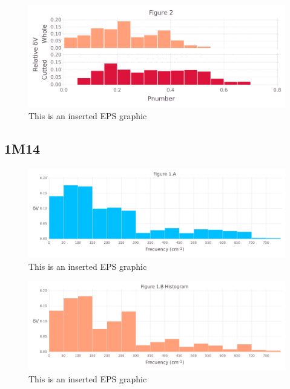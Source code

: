 \documentclass[10pt,letterpaper]{article}
\begin{document}
\begin{figure}[ht]
\begin{center}
\includegraphics[scale=0.5]{1xkk/3both_figure_very_hi-precision.pdf}
\caption{This is an inserted EPS graphic}
\label{fig13}
\end{center}
\end{figure}

\FloatBarrier
\newpage

\subsection{1M14}

\begin{figure}[ht]
\begin{center}
\includegraphics[scale=0.5]{1m14/1afigure_very_hi-precision.pdf}
\caption{This is an inserted EPS graphic}
\label{fig1}
\end{center}
\end{figure}

\begin{figure}[ht]
\begin{center}
\includegraphics[scale=0.5]{1m14/1bfigure_very_hi-precision.pdf}
\caption{This is an inserted EPS graphic}
\label{fig2}
\end{center}
\end{figure}
\end{document}
